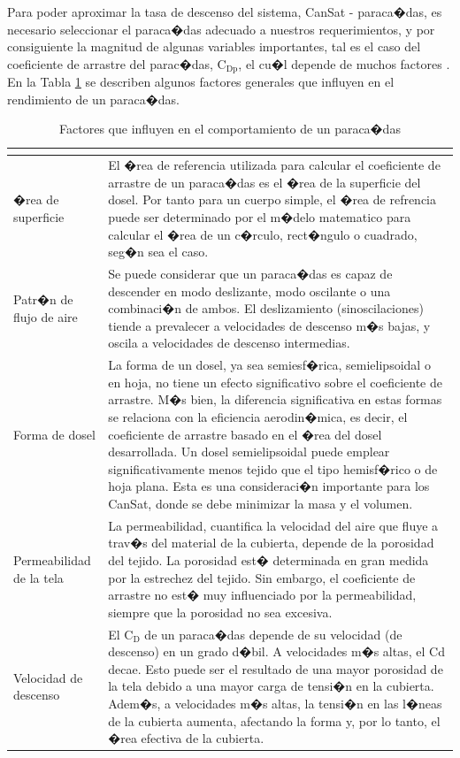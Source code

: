 \documentclass[10pt,a4paper]{book}
\begin{document}
Para poder aproximar la tasa de descenso del sistema, CanSat - paraca�das, es necesario seleccionar el paraca�das adecuado a nuestros requerimientos, y por consiguiente la magnitud de algunas variables importantes, tal es el caso del coeficiente de arrastre del parac�das, $\text{C}_{\text{Dp}}$,  el cu�l depende de muchos factores \cite{Parachute}. En la Tabla \ref{FactParacaidas} se describen algunos factores generales que influyen en el rendimiento de un paraca�das. 

\begin{table}[H]
\begin{center}
\caption{Factores que influyen en el comportamiento de un paraca�das}
\label{FactParacaidas}
\resizebox{14cm}{!} {
\begin{tabular}{m{4cm}p{14cm}}
\multicolumn{2}{c}{}\tabularnewline
\toprule
�rea de superficie & El �rea de referencia utilizada para calcular el coeficiente de arrastre de un paraca�das es el �rea de la superficie del dosel. Por tanto para un cuerpo simple, el �rea de refrencia puede ser determinado por el m�delo matematico para calcular el �rea de un c�rculo, rect�ngulo o cuadrado, seg�n sea el caso. \tabularnewline
Patr�n de flujo de aire & Se puede considerar que un paraca�das es capaz de descender en modo deslizante, modo oscilante o una combinaci�n de ambos. El deslizamiento (sinoscilaciones) tiende a prevalecer a velocidades de descenso m�s bajas, y oscila a velocidades de descenso intermedias.\tabularnewline
Forma de dosel & La forma de un dosel, ya sea semiesf�rica, semielipsoidal o en hoja, no tiene un efecto significativo sobre el coeficiente de arrastre. M�s bien, la diferencia significativa en estas formas se relaciona con la eficiencia aerodin�mica, es decir, el coeficiente de arrastre basado en el �rea del dosel desarrollada. Un dosel semielipsoidal puede emplear significativamente menos tejido que el tipo hemisf�rico o de hoja plana. Esta es una consideraci�n importante para los CanSat, donde se debe minimizar la masa y el volumen.\tabularnewline
Permeabilidad de la tela & La permeabilidad, cuantifica la velocidad del aire que fluye a trav�s del material de la cubierta, depende de la porosidad del tejido. La porosidad est� determinada en gran medida por la estrechez del tejido. Sin embargo, el coeficiente de arrastre no est� muy influenciado por la permeabilidad, siempre que la porosidad no sea excesiva. \tabularnewline
Velocidad de descenso & El $\text{C}_{\text{D}}$ de un paraca�das depende de su velocidad (de descenso) en un grado d�bil. A velocidades m�s altas, el Cd decae. Esto puede ser el resultado de una mayor porosidad de la tela debido a una mayor carga de tensi�n en la cubierta. Adem�s, a velocidades m�s altas, la tensi�n en las l�neas de la cubierta aumenta, afectando la forma y, por lo tanto, el �rea efectiva de la cubierta.\tabularnewline

\end{tabular}}
\end{center}
\end{table}
\end{document}
